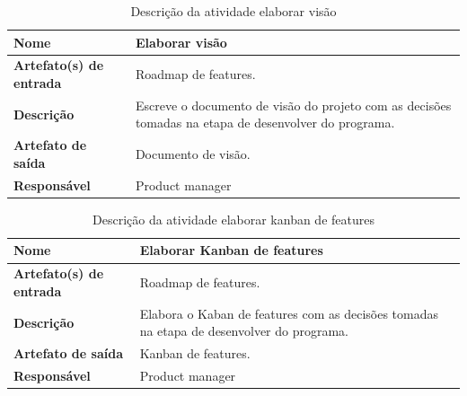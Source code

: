     \begin{table}[H]
        \centering
        \label{descricaoAtividades13}
        \caption{Descrição da atividade elaborar visão}
            \begin{tabular}{|l|p{10cm}|}
            \hline
            \textbf{Nome} & Elaborar visão \\
            \hline
            \textbf{Artefato(s) de entrada} & Roadmap de features. \\
            \hline
            \textbf{Descrição} & Escreve o documento de visão do projeto com as decisões tomadas na etapa de desenvolver do programa. \\
            \hline
            \textbf{Artefato de saída} & Documento de visão. \\
            \hline
            \textbf{Responsável} & Product manager \\
            \hline
        \end{tabular}
    \end{table}

    \begin{table}[H]
        \centering
        \label{descricaoAtividades14}
        \caption{Descrição da atividade elaborar kanban de features}
            \begin{tabular}{|l|p{10cm}|}
            \hline
            \textbf{Nome} & Elaborar Kanban de features \\
            \hline
            \textbf{Artefato(s) de entrada} & Roadmap de features. \\
            \hline
            \textbf{Descrição} & Elabora o Kaban de features com as decisões tomadas na etapa de desenvolver do programa. \\
            \hline
            \textbf{Artefato de saída} & Kanban de features. \\
            \hline
            \textbf{Responsável} & Product manager \\
            \hline
        \end{tabular}
    \end{table}

